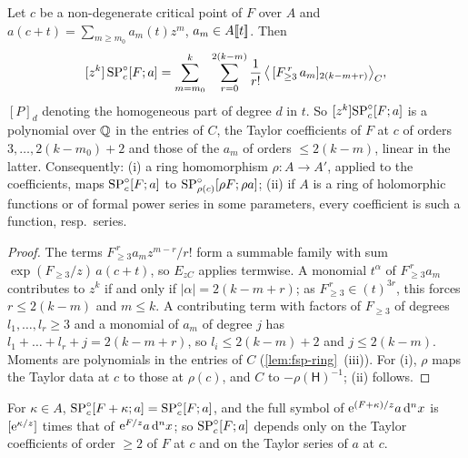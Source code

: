 
\begin{lem}
\label{lem:fsp-univ}
Let $c$ be a non-degenerate critical point of $F$ over $A$ and $a(c+t)=\sum_{m\geq m_0}a_m(t)z^m$, $a_m\in A[\![ t ]\!]$. Then
\begin{equation}
\label{eq:fsp-univ}
\coef{z^k}\,\SPn_c[F;a]=\sum_{m=m_0}^{k}\ \sum_{r=0}^{2(k-m)}\frac1{r!}\,\bigl\langle\,[F_{\geq3}^{\,r}\,a_m]_{2(k-m+r)}\bigr\rangle_C ,
\end{equation}
$[P]_d$ denoting the homogeneous part of degree $d$ in $t$. So $[z^k]\mathrm{SP}^{\circ}_c[F;a]$ is a polynomial over $\mathbb{Q}$ in the entries of $C$, the Taylor coefficients of $F$ at $c$ of orders $3,\dots,2(k-m_0)+2$ and those of the $a_m$ of orders $\leq2(k-m)$, linear in the latter. Consequently: (i) a ring homomorphism $\rho\colon A\to A'$, applied to the coefficients, maps $\mathrm{SP}^{\circ}_c[F;a]$ to $\mathrm{SP}^{\circ}_{\rho(c)}[\rho F;\rho a]$; (ii) if $A$ is a ring of holomorphic functions or of formal power series in some parameters, every coefficient is such a function, resp.\ series.
\end{lem}

\begin{proof}
The terms $F_{\geq3}^{\,r}a_mz^{m-r}/r!$ form a summable family with sum $\exp(F_{\geq3}/z)\,a(c+t)$, so $E_{zC}$ applies termwise. A monomial $t^\alpha$ of $F_{\geq3}^{\,r}a_m$ contributes to $z^k$ if and only if $|\alpha|=2(k-m+r)$; as $F_{\geq3}^{\,r}\in(t)^{3r}$, this forces $r\leq2(k-m)$ and $m\leq k$. A contributing term with factors of $F_{\geq3}$ of degrees $l_1,\dots,l_r\geq3$ and a monomial of $a_m$ of degree $j$ has $l_1+\dots+l_r+j=2(k-m+r)$, so $l_i\leq2(k-m)+2$ and $j\leq2(k-m)$. Moments are polynomials in the entries of $C$ (\cref{lem:fsp-ring}~(iii)). For (i), $\rho$ maps the Taylor data at $c$ to those at $\rho(c)$, and $C$ to $-\rho(\mathsf H)^{-1}$; (ii) follows.
\end{proof}

\begin{lem}[Constants]
\label{lem:fsp-const}
For $\kappa\in A$, $\mathrm{SP}^{\circ}_c[F+\kappa;a]=\mathrm{SP}^{\circ}_c[F;a]$, and the full symbol of $\mathrm{e}^{(F+\kappa)/z}a\,\mathrm{d}^nx$ is $[\mathrm{e}^{\kappa/z}]$ times that of $\mathrm{e}^{F/z}a\,\mathrm{d}^nx$; so $\mathrm{SP}^{\circ}_c[F;a]$ depends only on the Taylor coefficients of order $\geq2$ of $F$ at $c$ and on the Taylor series of $a$ at $c$.
\end{lem}

